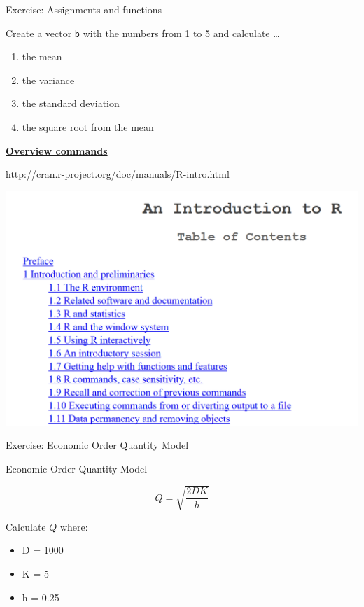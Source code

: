 \documentclass[
  10pt,
  ignorenonframetext,
]{beamer}
\providecommand{\tightlist}{%
  \setlength{\itemsep}{0pt}\setlength{\parskip}{0pt}}
\begin{document}
\begin{frame}[fragile]{Exercise: Assignments and functions}
\protect\hypertarget{exercise-assignments-and-functions}{}

Create a vector \texttt{b} with the numbers from 1 to 5 and calculate
\ldots{}

\begin{enumerate}
\item
  the mean
\item
  the variance
\item
  the standard deviation
\item
  the square root from the mean
\end{enumerate}

\end{frame}

\begin{frame}{\href{http://cran.r-project.org/doc/manuals/R-intro.html}{\textbf{Overview
commands}}}
\protect\hypertarget{overview-commands}{}

\url{http://cran.r-project.org/doc/manuals/R-intro.html}

\includegraphics{figure/UebersichtBefehle.PNG}

\end{frame}

\begin{frame}{Exercise: Economic Order Quantity Model}
\protect\hypertarget{exercise-economic-order-quantity-model}{}

\begin{block}{Economic Order Quantity Model}

\[
Q = \sqrt{\dfrac{2DK}{h}}
\]

\end{block}

\begin{block}{Calculate \(Q\) where:}

\begin{itemize}
\tightlist
\item
  D = 1000
\item
  K = 5
\item
  h = 0.25
\end{itemize}

\end{block}

\end{frame}
\end{document}
